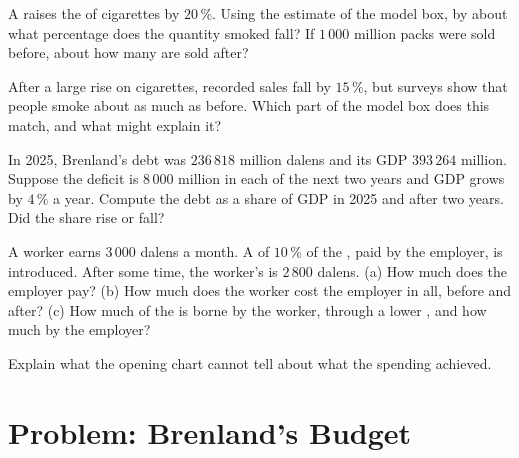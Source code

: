\begin{exercise}[$\star\star$]\label{exo:g8:taxes-and-public-spending:8}
A  raises the  of cigarettes by $20\,\%$. Using the estimate of the model box, by about what
percentage does the quantity smoked fall? If $1\,000$ million packs were sold before, about how many
are sold after?
\end{exercise}

\begin{exercise}[$\star\star$]\label{exo:g8:taxes-and-public-spending:9}
After a large  rise on cigarettes, recorded sales fall by $15\,\%$, but surveys show that people
smoke about as much as before. Which part of the model box does this match, and what might explain
it?
\end{exercise}

\begin{exercise}[$\star\star\star$]\label{exo:g8:taxes-and-public-spending:10}
In 2025, Brenland's debt was $236\,818$ million dalens and its GDP $393\,264$ million. Suppose the
deficit is $8\,000$ million in each of the next two years and GDP grows by $4\,\%$ a year. Compute the
debt as a share of GDP in 2025 and after two years. Did the share rise or fall?
\end{exercise}

\begin{exercise}[$\star\star\star$]\label{exo:g8:taxes-and-public-spending:11}
A worker earns $3\,000$ dalens a month. A  of $10\,\%$ of the , paid by the employer,
is introduced. After some time, the worker's  is $2\,800$ dalens. (a) How much  does the
employer pay? (b) How much does the worker cost the employer in all, before and after? (c) How much of
the  is borne by the worker, through a lower , and how much by the employer?
\end{exercise}

\begin{exercise}[$\star\star\star$]\label{exo:g8:taxes-and-public-spending:12}
Explain what the opening chart cannot tell about what the spending achieved.
\end{exercise}

\section{Problem: Brenland's Budget}

